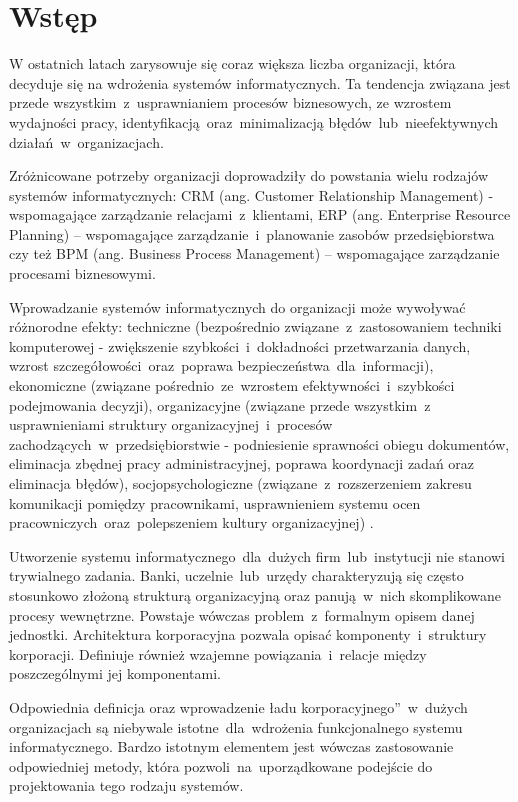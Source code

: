 \chapter{Wstęp}
W ostatnich latach zarysowuje się coraz większa liczba organizacji, która decyduje się na wdrożenia systemów informatycznych. Ta tendencja związana jest przede wszystkim~z~usprawnianiem procesów biznesowych, ze wzrostem wydajności pracy, identyfikacją~oraz~minimalizacją błędów~lub~nieefektywnych działań~w~organizacjach.

Zróżnicowane potrzeby organizacji doprowadziły do powstania wielu rodzajów systemów informatycznych: CRM (ang. Customer Relationship Management) - wspomagające zarządzanie relacjami~z~klientami, ERP (ang. Enterprise Resource Planning) – wspomagające zarządzanie~i~planowanie zasobów przedsiębiorstwa czy też BPM (ang. Business Process Management) – wspomagające zarządzanie procesami biznesowymi. 

Wprowadzanie systemów informatycznych do organizacji może wywoływać różnorodne efekty: techniczne (bezpośrednio związane~z~zastosowaniem techniki komputerowej - zwiększenie szybkości~i~dokładności przetwarzania danych, wzrost szczegółowości~oraz~poprawa bezpieczeństwa~dla~informacji), ekonomiczne (związane pośrednio~ze~wzrostem efektywności~i~szybkości podejmowania decyzji), organizacyjne (związane przede wszystkim~z~ usprawnieniami struktury organizacyjnej~i~procesów zachodzących~w~przedsiębiorstwie - podniesienie sprawności obiegu dokumentów, eliminacja zbędnej pracy administracyjnej, poprawa koordynacji zadań oraz eliminacja błędów), socjopsychologiczne (związane~z~rozszerzeniem zakresu komunikacji pomiędzy pracownikami, usprawnieniem systemu ocen pracowniczych~oraz~polepszeniem kultury organizacyjnej) \cite{EfektyZasSys}.

Utworzenie systemu informatycznego~dla~dużych firm~lub~instytucji nie stanowi trywialnego zadania. Banki, uczelnie~lub~urzędy charakteryzują się często stosunkowo złożoną strukturą organizacyjną oraz panują~w~nich skomplikowane procesy wewnętrzne. Powstaje wówczas problem~z~formalnym opisem danej jednostki. Architektura korporacyjna pozwala opisać komponenty~i~struktury korporacji. Definiuje również wzajemne powiązania~i~relacje między poszczególnymi jej komponentami. 
 
Odpowiednia definicja oraz wprowadzenie \quotedblbase ładu korporacyjnego\textquotedblright~w~dużych organizacjach są niebywale istotne~dla~wdrożenia funkcjonalnego systemu informatycznego. Bardzo istotnym elementem jest wówczas zastosowanie odpowiedniej metody, która pozwoli~na~uporządkowane podejście do projektowania tego rodzaju systemów.

